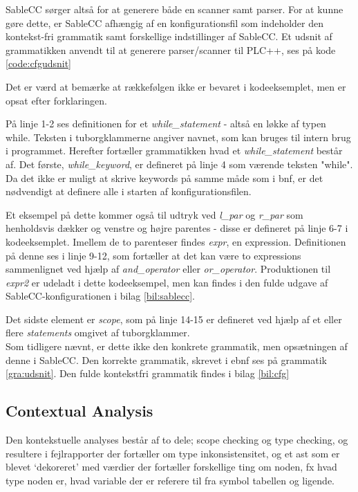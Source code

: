 SableCC sørger altså for at generere både en scanner samt parser. For at kunne gøre dette, er SableCC afhængig af en konfigurationsfil som indeholder den kontekst-fri grammatik samt forskellige indstillinger af SableCC. Et udsnit af grammatikken anvendt til at generere parser/scanner til PLC++, ses på kode \ref{code:cfgudsnit}


\noindent Det er værd at bemærke at rækkefølgen ikke er bevaret i kodeeksemplet, men er opsat efter forklaringen.

På linje 1-2 ses definitionen for et \textit{while\_statement} - altså en løkke af typen while. Teksten i tuborgklammerne angiver navnet, som kan bruges til intern brug i programmet. Herefter fortæller grammatikken hvad et \textit{while\_statement} består af. Det første, \textit{while\_keyword}, er defineret på linje 4 som værende teksten "while"\mbox{}. Da det ikke er muligt at skrive keywords på samme måde som i \gls{bnf}, er det nødvendigt at definere alle i starten af konfigurationsfilen.

Et eksempel på dette kommer også til udtryk ved \textit{l\_par} og \textit{r\_par} som henholdsvis dækker og venstre og højre parentes - disse er defineret på linje 6-7 i kodeeksemplet. Imellem de to parenteser findes \textit{expr}, en expression. Definitionen på denne ses i linje 9-12, som fortæller at det kan være to expressions sammenlignet ved hjælp af \textit{and\_operator} eller \textit{or\_operator}. Produktionen til \textit{expr2} er udeladt i dette kodeeksempel, men kan findes i den fulde udgave af SableCC-konfigurationen i bilag \ref{bil:sablecc}.

Det sidste element er \textit{scope}, som på linje 14-15 er defineret ved hjælp af et eller flere \textit{statements} omgivet af tuborgklammer.\\

\noindent Som tidligere nævnt, er dette ikke den konkrete grammatik, men opsætningen af denne i SableCC. Den korrekte grammatik, skrevet i \gls{ebnf} ses på grammatik \ref{gra:udsnit}. Den fulde kontekstfri grammatik findes i bilag \ref{bil:cfg}



\subsection{Contextual Analysis}\wip
    Den kontekstuelle analyses består af to dele; scope checking og type checking, og resultere i fejlrapporter der fortæller om type inkonsistensitet, og et \gls{ast} som er blevet \enquote*{dekoreret} med værdier der fortæller forskellige ting om noden, fx hvad type noden er, hvad variable der er referere til fra symbol tabellen og ligende. %
    

